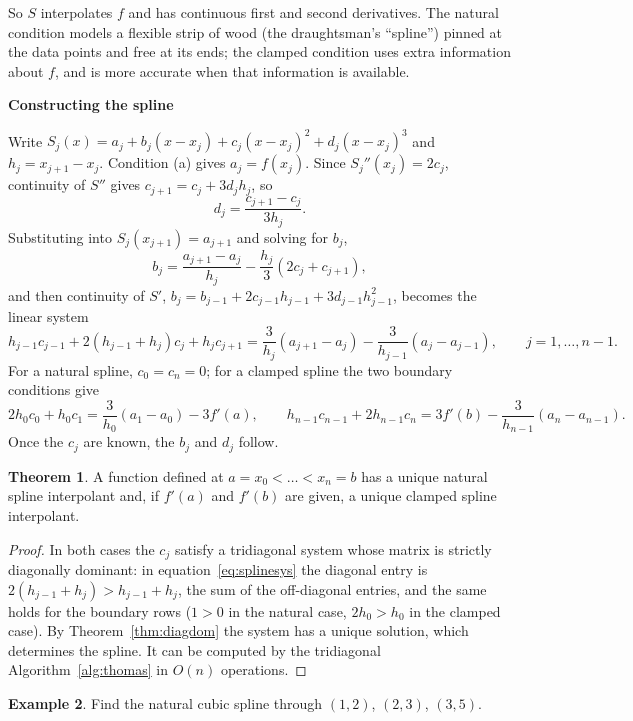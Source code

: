 \documentclass[11pt,a4paper]{article}
\numberwithin{equation}{section}
\theoremstyle{definition}
\newtheorem{thm}{Theorem}[subsection]
\newtheorem{exa}[thm]{Example}
\newcommand{\subhead}[1]{%
  \par\medskip\noindent\textbf{#1}\par\nobreak\smallskip}
\begin{document}
So $S$ interpolates $f$ and has continuous first and second derivatives. The natural condition models a flexible strip of wood (the
draughtsman's ``spline'') pinned at the data points and free at its ends; the clamped condition uses extra information about $f$, and is
more accurate when that information is available.

\subhead{Constructing the spline}
Write $S_j(x) = a_j+b_j(x-x_j)+c_j(x-x_j)^2+d_j(x-x_j)^3$ and $h_j = x_{j+1}-x_j$. Condition (a) gives $a_j = f(x_j)$. Since
$S_j''(x_j) = 2c_j$, continuity of $S''$ gives $c_{j+1} = c_j+3d_jh_j$, so
$$d_j = \frac{c_{j+1}-c_j}{3h_j} .$$
Substituting into $S_j(x_{j+1}) = a_{j+1}$ and solving for $b_j$,
$$b_j = \frac{a_{j+1}-a_j}{h_j}-\frac{h_j}{3}(2c_j+c_{j+1}),$$
and then continuity of $S'$, $b_j = b_{j-1}+2c_{j-1}h_{j-1}+3d_{j-1}h_{j-1}^2$, becomes the linear system
\begin{equation}\label{eq:splinesys}
h_{j-1}c_{j-1}+2(h_{j-1}+h_j)c_j+h_jc_{j+1} = \frac{3}{h_j}(a_{j+1}-a_j)-\frac{3}{h_{j-1}}(a_j-a_{j-1}),\qquad j = 1,\dots,n-1 .
\end{equation}
For a natural spline, $c_0 = c_n = 0$; for a clamped spline the two boundary conditions give
$$2h_0c_0+h_0c_1 = \frac{3}{h_0}(a_1-a_0)-3f'(a),\qquad h_{n-1}c_{n-1}+2h_{n-1}c_n = 3f'(b)-\frac{3}{h_{n-1}}(a_n-a_{n-1}) .$$
Once the $c_j$ are known, the $b_j$ and $d_j$ follow.

\begin{thm}
\label{thm:splineunique}
A function defined at $a = x_0<\dots<x_n = b$ has a unique natural spline interpolant and, if $f'(a)$ and $f'(b)$ are given, a unique clamped
spline interpolant.
\end{thm}

\begin{proof}
In both cases the $c_j$ satisfy a tridiagonal system whose matrix is strictly diagonally dominant: in equation~\eqref{eq:splinesys} the
diagonal entry is $2(h_{j-1}+h_j)>h_{j-1}+h_j$, the sum of the off-diagonal entries, and the same holds for the boundary rows ($1>0$ in the
natural case, $2h_0>h_0$ in the clamped case). By Theorem~\ref{thm:diagdom} the system has a unique solution, which determines the
spline. It can be computed by the tridiagonal Algorithm~\ref{alg:thomas} in $O(n)$ operations.
\end{proof}

\begin{exa}
\label{exa:spline3}
Find the natural cubic spline through $(1,2)$, $(2,3)$, $(3,5)$.
\end{exa}
\end{document}
